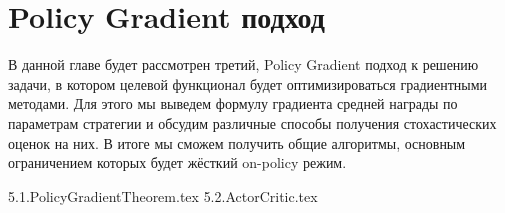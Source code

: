 \chapter{Policy Gradient подход}\label{policygradientchapter}

В данной главе будет рассмотрен третий, Policy Gradient подход к решению задачи, в котором целевой функционал будет оптимизироваться градиентными методами. Для этого мы выведем формулу градиента средней награды по параметрам стратегии и обсудим различные способы получения стохастических оценок на них. В итоге мы сможем получить общие алгоритмы, основным ограничением которых будет жёсткий on-policy режим.

{5.1.PolicyGradientTheorem.tex}
{5.2.ActorCritic.tex}
